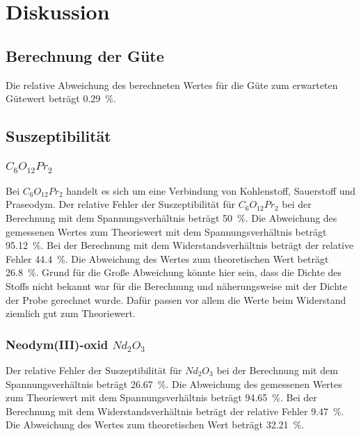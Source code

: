 \section{Diskussion}
\label{sec:Diskussion}

\subsection{Berechnung der Güte}
Die relative Abweichung des berechneten Wertes für die Güte zum erwarteten Gütewert beträgt \SI{0.29}{\percent}. 

\subsection{Suszeptibilität}
\subsubsection{$C_6 O_{12} Pr_2$}
Bei $C_6 O_{12} Pr_2$ handelt es sich um eine Verbindung von Kohlenstoff, Sauerstoff und Praseodym.
\newline
Der relative Fehler der Suszeptibilität für $C_6 O_{12} Pr_2$ bei der Berechnung mit dem Spannungsverhältnis beträgt \SI{50}{\percent}. 
Die Abweichung des gemessenen Wertes zum Theoriewert mit dem Spannungsverhältnis beträgt \SI{95.12}{\percent}.
\newline
Bei der Berechnung mit dem Widerstandsverhältnis beträgt der relative Fehler \SI{44.4}{\percent}.
Die Abweichung des Wertes zum theoretischen Wert beträgt \SI{26.8}{\percent}.
Grund für die Große Abweichung könnte hier sein, dass die Dichte des Stoffs nicht bekannt war für die Berechnung und näherungsweise mit der Dichte der Probe gerechnet wurde. Dafür passen vor allem die Werte beim Widerstand ziemlich gut zum Theoriewert.

\subsubsection{Neodym(III)-oxid $Nd_2 O_3$}
Der relative Fehler der Suszeptibilität für $Nd_2 O_3$ bei der Berechnung mit dem Spannungsverhältnis beträgt \SI{26.67}{\percent}. 
Die Abweichung des gemessenen Wertes zum Theoriewert mit dem Spannungsverhältnis beträgt \SI{94.65}{\percent}.
\newline
Bei der Berechnung mit dem Widerstandsverhältnis beträgt der relative Fehler \SI{9.47}{\percent}.
Die Abweichung des Wertes zum theoretischen Wert beträgt \SI{32.21}{\percent}.

